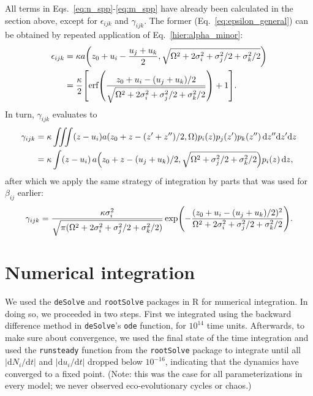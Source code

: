 \documentclass[10pt]{article}
\newcommand{\ud}{\text{d}}
\let\originalleft\left
\let\originalright\right
\renewcommand{\left}{\mathopen{}\mathclose\bgroup\originalleft}
\renewcommand{\right}{\aftergroup\egroup\originalright}
\begin{document}
All terms in Eqs.~\ref{eq:n_spp}-\ref{eq:m_spp} have already been calculated in the section above, except for $\epsilon_{ijk}$ and $\gamma_{ijk}$. The former (Eq.~\ref{eq:epsilon_general}) can be obtained by repeated application of Eq.~\ref{hier:alpha_minor}:
\begin{equation}
  \label{hierhoi:epsilon}
  \begin{aligned}
  \epsilon_{ijk}
  &= \kappa a\left( z_0 + u_i - \frac{u_j + u_k}{2},
  \sqrt{\Omega^2 + 2\sigma_i^2 + \sigma_j^2/2 + \sigma_k^2/2} \right)
  \\
  &= \frac{\kappa}{2} \left[ \text{erf} \left(
  \frac{z_0+u_i-(u_j+u_k)/2}{\sqrt{\Omega^2+2\sigma_i^2+
  \sigma_j^2/2+\sigma_k^2/2}}\right) + 1 \right] .
  \end{aligned}
\end{equation}
In turn, $\gamma_{ijk}$ evaluates to
\begin{equation}
  \label{hierhoi:gamma_ijk}
  \begin{aligned}
  \gamma_{ijk}
  &= \kappa \iiint (z - u_i) a(z_0+z-(z'+z'')/2,\Omega)
  p_i(z) p_j(z') p_k(z'') \,\ud z'' \ud z' \ud z
  \\
  &= \kappa \int (z - u_i) \, a\left(z_0+z-(u_j+u_k)/2,
  \sqrt{\Omega^2+\sigma_j^2/2+\sigma_k^2/2}\right) p_i(z) \,\ud z ,
  \end{aligned}
\end{equation}
after which we apply the same strategy of integration by parts that was used for $\beta_{ij}$ earlier:
\begin{equation}
  \gamma_{ijk} = \frac{\kappa \sigma_i^2}{\sqrt{
  \pi(\Omega^2+2\sigma_i^2+\sigma_j^2/2+\sigma_k^2/2)}}
  \exp \left( -\frac{(z_0+u_i-(u_j+u_k)/2)^2}{
  \Omega^2+2\sigma_i^2+\sigma_j^2/2+\sigma_k^2/2}\right) .
\end{equation}


\section{Numerical integration}

We used the \texttt{deSolve} and \texttt{rootSolve} packages in R \citep{r_core_team_r_2022} for numerical integration. In doing so, we proceeded in two steps. First we integrated using the backward difference method in \texttt{deSolve}'s \texttt{ode} function, for $10^{14}$ time units. Afterwards, to make sure about convergence, we used the final state of the time integration and used the \texttt{runsteady} function from the \texttt{rootSolve} package to integrate until all $|\ud N_i / \ud t|$ and $|\ud u_i / \ud t|$ dropped below $10^{-16}$, indicating that the dynamics have converged to a fixed point. (Note: this was the case for all parameterizations in every model; we never observed eco-evolutionary cycles or chaos.)
\end{document}
